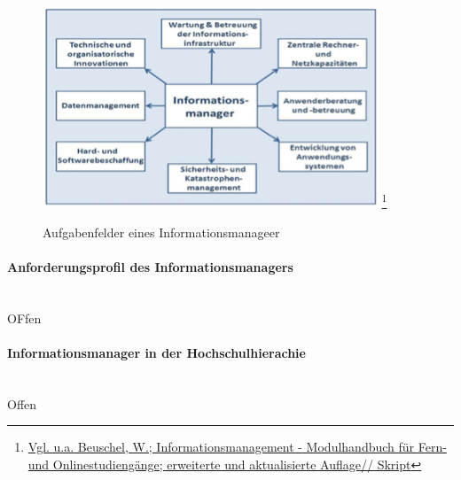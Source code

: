 \begin{figure}[h!]
	\centering
	\includegraphics[width=10cm]{kapitel/gruppe1_2/bilder/aufgabenfelder_des_cio} 
	\footnote{\url{Vgl. u.a. Beuschel, W.; Informationsmanagement - Modulhandbuch für Fern- und Onlinestudiengänge; erweiterte und aktualisierte Auflage// Skript}}
	\caption{Aufgabenfelder eines Informationsmanageer}
	\label{fig_aufgaben_cio}
\end{figure}




\paragraph{Anforderungsprofil des Informationsmanagers}\mbox{}\\
OFfen

\paragraph{Informationsmanager in der Hochschulhierachie}\mbox{}\\
Offen

